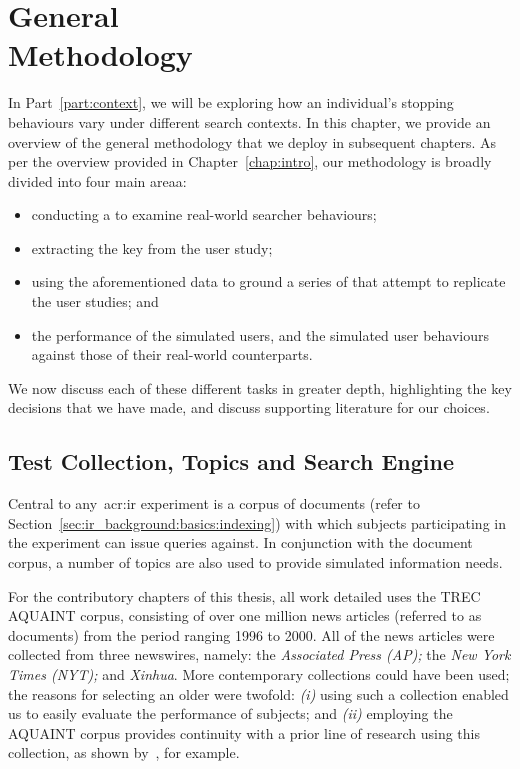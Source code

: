 
\chapter[General Methodology]{General\\Methodology}\label{chap:method}
In Part~\ref{part:context}, we will be exploring how an individual's stopping behaviours vary under different search contexts. In this chapter, we provide an overview of the general methodology that we deploy in subsequent chapters. As per the overview provided in Chapter~\ref{chap:intro}, our methodology is broadly divided into four main areaa:

\begin{itemize}
    \item{conducting a  to examine real-world searcher behaviours;}
    \item{extracting the key  from the user study;}
    \item{using the aforementioned data to ground a series of  that attempt to replicate the user studies; and}
    \item{ the performance of the simulated users, and  the simulated user behaviours against those of their real-world counterparts.}
\end{itemize}

We now discuss each of these different tasks in greater depth, highlighting the key decisions that we have made, and discuss supporting literature for our choices.

\section{Test Collection, Topics and Search Engine}\label{sec:csm:methodology:collection}
Central to any~\gls{acr:ir} experiment is a corpus of documents (refer to Section~\ref{sec:ir_background:basics:indexing}) with which subjects participating in the experiment can issue queries against. In conjunction with the document corpus, a number of topics are also used to provide simulated information needs.

For the contributory chapters of this thesis, all work detailed uses the TREC AQUAINT corpus, consisting of over one million news articles (referred to as documents) from the period ranging 1996 to 2000. All of the news articles were collected from three newswires, namely: the \emph{Associated Press (AP);} the \emph{New York Times (NYT);} and \emph{Xinhua}. More contemporary collections could have been used; the reasons for selecting an older were twofold: \emph{(i)} using such a collection enabled us to easily evaluate the performance of subjects; and \emph{(ii)} employing the AQUAINT corpus provides continuity with a prior line of research using this collection, as shown by~\cite{azzopardi2013query_cost}, for example.


